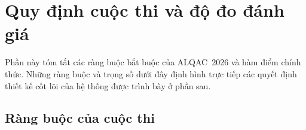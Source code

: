 \documentclass[conference]{IEEEtran}
\begin{document}

\section{Quy định cuộc thi và độ đo đánh giá}
\label{sec:rules}

Phần này tóm tắt các ràng buộc bắt buộc của ALQAC~2026 và hàm điểm chính
thức. Những ràng buộc và trọng số dưới đây định hình trực tiếp các quyết định
thiết kế cốt lõi của hệ thống được trình bày ở phần sau.

\subsection{Ràng buộc của cuộc thi}
\label{subsec:constraints}
\end{document}
